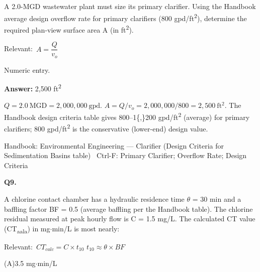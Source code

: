 \documentclass[11pt]{article}
\newcommand{\optline}[2]{\par\noindent\hspace{1.2em}(#1)\hspace{0.6em}#2}
\begin{document}
A 2.0-MGD wastewater plant must size its primary clarifier. Using the Handbook average design overflow rate for primary clarifiers (800 gpd/ft\textsuperscript{2}), determine the required plan-view surface area A (in ft\textsuperscript{2}).\par\vspace{3pt}
{\small\color{soft}Relevant:}\ $A = \dfrac{Q}{v_o}$\par\vspace{3pt}
{\small\color{soft}Numeric entry.}\par\vspace{3pt}
\vspace{2pt}\par\noindent\colorbox{boxbg}{\parbox{\dimexpr\linewidth-2\fboxsep\relax}{%
\vspace{2pt}\textbf{Answer:} 2,500 ft\textsuperscript{2}\par\vspace{2pt}
{\small $Q = 2.0\ \mathrm{MGD} = 2{,}000{,}000\ \mathrm{gpd}$.  $A = Q/v_o = 2{,}000{,}000/800 = 2{,}500\ \mathrm{ft^2}$. The Handbook design criteria table gives 800--1\{,\}200 gpd/ft\textsuperscript{2} (average) for primary clarifiers; 800 gpd/ft\textsuperscript{2} is the conservative (lower-end) design value.}\par\vspace{2pt}
{\footnotesize\color{soft}Handbook: Environmental Engineering --- Clarifier (Design Criteria for Sedimentation Basins table) \textbullet\ Ctrl-F: Primary Clarifier; Overflow Rate; Design Criteria}\vspace{2pt}
}}
\vspace{9pt}
\filbreak
\textbf{\color{accent}Q9.}\par\vspace{2pt}
A chlorine contact chamber has a hydraulic residence time $\theta$ = 30 min and a baffling factor BF = 0.5 (average baffling per the Handbook table). The chlorine residual measured at peak hourly flow is C = 1.5 mg/L. The calculated CT value (CT\textsubscript{a}\textsubscript{a}\textsubscript{l}\textsubscript{a}) in mg$\cdot$min/L is most nearly:\par\vspace{3pt}
{\small\color{soft}Relevant:}\ $CT_{calc} = C\times t_{10}$ \quad $t_{10} \approx \theta\times BF$\par\vspace{3pt}
\optline{A}{3.5 mg$\cdot$min/L}
\end{document}
